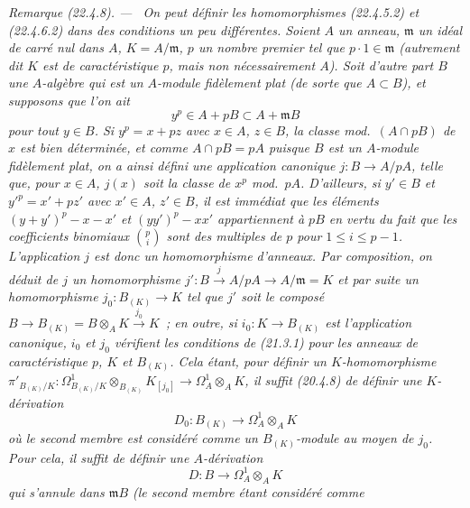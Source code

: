 \documentclass[10pt,oneside]{book}
\makeatletter
\newcommand{\setmanualcurrentlabel}[1]{\def\@currentlabel{#1}}
\newenvironment{remark}[1][]{%
  \setmanualcurrentlabel{#1}\par\medskip\noindent\itshape Remarque (#1). ---\ }{\par}
\makeatother
\begin{document}
\begin{remark}[22.4.8]
\label{0.22.4.8-fr}
On peut définir les homomorphismes (22.4.5.2) et (22.4.6.2) dans des conditions
un peu différentes. Soient $A$ un anneau, $\mathfrak m$ un idéal \emph{de carré
nul} dans $A$, $K=A/\mathfrak m$, $p$ un nombre premier tel que
$p\cdot1\in\mathfrak m$ (autrement dit $K$ est de caractéristique $p$, mais non
nécessairement $A$). Soit d'autre part $B$ une $A$-algèbre qui est un $A$-module
\emph{fidèlement plat} (de sorte que $A\subset B$), et supposons que l'on ait
\begin{equation}
\label{0.22.4.8.1-fr}
  y^p\in A+pB\subset A+\mathfrak mB
  \tag{22.4.8.1}
\end{equation}
pour tout $y\in B$. Si $y^p=x+pz$ avec $x\in A$, $z\in B$, la \emph{classe}
mod.~$(A\cap pB)$ de $x$ est bien déterminée, et comme $A\cap pB=pA$ puisque
$B$ est un $A$-module fidèlement plat, on a ainsi défini une application
canonique $j:B\longrightarrow A/pA$, telle que, pour $x\in A$, $j(x)$ soit la
classe de $x^p$ mod.~$pA$. D'ailleurs, si $y'\in B$ et
$y'^p=x'+pz'$ avec $x'\in A$, $z'\in B$, il est immédiat que les éléments
$(y+y')^p-x-x'$ et $(yy')^p-xx'$ appartiennent à $pB$ en vertu du fait que les
coefficients binomiaux $\binom pi$ sont des multiples de $p$ pour
$1\leqslant i\leqslant p-1$. L'application $j$ est donc un
\emph{homomorphisme d'anneaux}. Par composition, on déduit de $j$ un
homomorphisme $j':B\xrightarrow{j}A/pA\longrightarrow A/\mathfrak m=K$ et par
suite un homomorphisme $j_0:B_{(K)}\longrightarrow K$ tel que $j'$ soit le
composé $B\longrightarrow B_{(K)}=B\otimes_AK\xrightarrow{j_0}K$~; en outre,
si $i_0:K\longrightarrow B_{(K)}$ est l'application canonique, $i_0$ et $j_0$
vérifient les conditions de (21.3.1) pour les anneaux \emph{de caractéristique
$p$}, $K$ et $B_{(K)}$. Cela étant, pour définir un $K$-homomorphisme
$\pi'_{B_{(K)}/K}:\Omega^1_{B_{(K)}/K}\otimes_{B_{(K)}}K_{[j_0]}
\longrightarrow\Omega^1_A\otimes_AK$, il suffit (20.4.8) de définir une
$K$-dérivation
\begin{equation}
\label{0.22.4.8.2-fr}
  D_0:B_{(K)}\longrightarrow\Omega^1_A\otimes_AK
  \tag{22.4.8.2}
\end{equation}
où le second membre est considéré comme un $B_{(K)}$-module au moyen de $j_0$.
Pour cela, il suffit de définir une $A$-dérivation
\begin{equation}
\label{0.22.4.8.3-fr}
  D:B\longrightarrow\Omega^1_A\otimes_AK
  \tag{22.4.8.3}
\end{equation}
qui \emph{s'annule dans} $\mathfrak mB$ (le second membre étant considéré comme

\end{remark}
\end{document}
